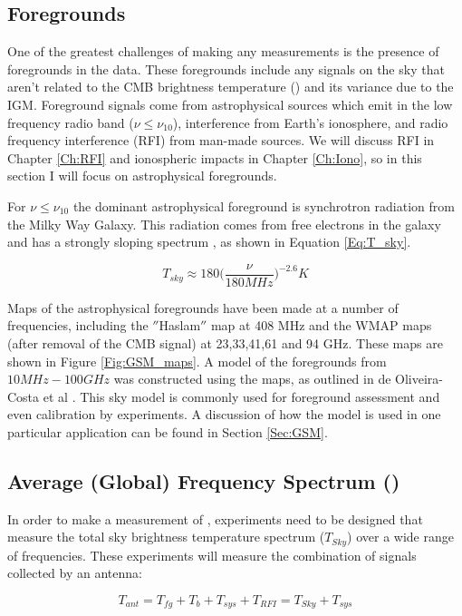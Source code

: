 \subsection{Foregrounds}
One of the greatest challenges of making any \cm measurements is the presence of foregrounds in the data. These foregrounds include any signals on the sky that aren't related to the CMB brightness temperature (\tb) and its variance due to the IGM. Foreground signals come from astrophysical sources which emit in the low frequency radio band ($\nu \leq \nu_{10}$), interference from Earth's ionosphere, and radio frequency interference (RFI) from man-made sources. We will discuss RFI in Chapter \ref{Ch:RFI} and ionospheric impacts in Chapter \ref{Ch:Iono}, so in this section I will focus on astrophysical foregrounds. 

For $\nu \leq \nu_{10}$ the dominant astrophysical foreground is synchrotron radiation from the Milky Way Galaxy. This radiation comes from free electrons in the galaxy and has a strongly sloping spectrum \cite{furlanetto_2006}, as shown in Equation \ref{Eq:T_sky}. 

\begin{equation}\label{Eq:T_sky}
T_{sky} \approx 180 \Big( \frac{\nu}{180 MHz} \Big)^{-2.6} K
\end{equation}

Maps of the astrophysical foregrounds have been made at a number of frequencies, including the $''$Haslam$''$ map at 408 MHz and the WMAP maps (after removal of the CMB signal) at 23,33,41,61 and 94 GHz. These maps are shown in Figure \ref{Fig:GSM_maps}. A model of the foregrounds from $10 MHz-100 GHz$ was constructed using the maps, as outlined in de Oliveira-Costa et al \cite{GSM_model}. This sky model is commonly used for foreground assessment and even calibration by \cm experiments. A discussion of how the model is used in one particular application can be found in Section \ref{Sec:GSM}. 

\subsection{Average (Global) \cm Frequency Spectrum (\avgdtb)}
In order to make a measurement of \avgdtb, experiments need to be designed that measure the total sky brightness temperature spectrum ($T_{Sky}$) over a wide range of frequencies. These experiments will measure the combination of signals collected by an antenna:

\begin{equation}
T_{ant} = T_{fg} + T_b +T_{sys}+T_{RFI} = T_{Sky} + T_{sys}
\end{equation}

